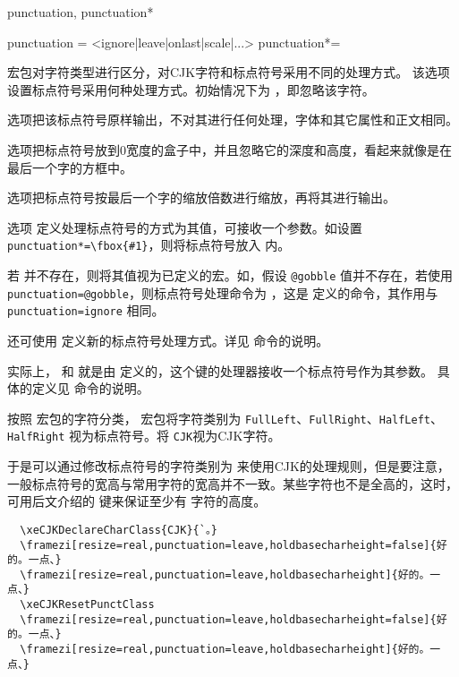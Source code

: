 \documentclass{ctxdoc}
\begin{document}
\begin{function}{punctuation, punctuation*}
  \begin{syntax}
    punctuation = <ignore|leave|onlast|scale|...> 
    punctuation*= 
  \end{syntax}
   宏包对字符类型进行区分，对CJK字符和标点符号采用不同的处理方式。
  该选项设置标点符号采用何种处理方式。初始情况下为 ，即忽略该字符。

   选项把该标点符号原样输出，不对其进行任何处理，字体和其它属性和正文相同。

   选项把标点符号放到0宽度的盒子中，并且忽略它的深度和高度，看起来就像是在最后一个字的方框中。

   选项把标点符号按最后一个字的缩放倍数进行缩放，再将其进行输出。
  
  选项  定义处理标点符号的方式为其值，可接收一个参数。如设置 \verb|punctuation*=\fbox{#1}|，则将标点符号放入  内。
  
  若  并不存在，则将其值视为已定义的宏。如，假设 \verb|@gobble| 值并不存在，若使用 \verb|punctuation=@gobble|，则标点符号处理命令为 ，这是 \LaTeXe 定义的命令，其作用与 \verb|punctuation=ignore| 相同。
  
  还可使用  定义新的标点符号处理方式。详见  命令的说明。
  
  实际上， 和  就是由  定义的，这个键的处理器接收一个标点符号作为其参数。
  具体的定义见  命令的说明。
\end{function}
\begin{texnote}
  按照  宏包的字符分类， 宏包将字符类别为 \verb|FullLeft|、\verb|FullRight|、\verb|HalfLeft|、\verb|HalfRight| 视为标点符号。将 \verb|CJK|视为CJK字符。

于是可以通过修改标点符号的字符类别为  来使用CJK的处理规则，但是要注意，一般标点符号的宽高与常用字符的宽高并不一致。某些字符也不是全高的，这时，可用后文介绍的  键来保证至少有  字符的高度。
\begin{verbatim}
  \xeCJKDeclareCharClass{CJK}{`。}
  \framezi[resize=real,punctuation=leave,holdbasecharheight=false]{好的。一点、}
  \framezi[resize=real,punctuation=leave,holdbasecharheight]{好的。一点、}
  \xeCJKResetPunctClass
  \framezi[resize=real,punctuation=leave,holdbasecharheight=false]{好的。一点、}
  \framezi[resize=real,punctuation=leave,holdbasecharheight]{好的。一点、}
\end{verbatim}

\xeCJKResetPunctClass

\end{texnote}
\end{document}
